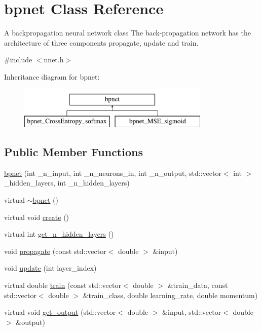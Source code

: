 \hypertarget{classbpnet}{\section{bpnet Class Reference}
\label{classbpnet}
}


A backpropagation neural network class The back-\/propagation network has the architecture of three components propagate, update and train.  




{\ttfamily \#include $<$nnet.\-h$>$}

Inheritance diagram for bpnet\-:\begin{figure}[H]
\begin{center}
\leavevmode
\includegraphics[height=2.000000cm]{classbpnet}
\end{center}
\end{figure}
\subsection*{Public Member Functions}
\begin{DoxyCompactItemize}
\item 
\hyperlink{classbpnet_adfeeece0abde65630da85276488cc0b2}{bpnet} (int \-\_\-n\-\_\-input, int \-\_\-n\-\_\-neurons\-\_\-in, int \-\_\-n\-\_\-output, std\-::vector$<$ int $>$ \-\_\-hidden\-\_\-layers, int \-\_\-n\-\_\-hidden\-\_\-layers)
\item 
virtual \hyperlink{classbpnet_a7189286dfd5cfdd648bcc8c78a177891}{$\sim$bpnet} ()
\item 
virtual void \hyperlink{classbpnet_a3731e200c3191fc77be85f1db2c2d4f9}{create} ()
\item 
virtual int \hyperlink{classbpnet_aa35c06d999256c9aebeed4f38bca9d0f}{get\-\_\-n\-\_\-hidden\-\_\-layers} ()
\item 
void \hyperlink{classbpnet_a77cd3c63e9948e4b6cc9e3a0412e25ea}{propagate} (const std\-::vector$<$ double $>$ \&input)
\item 
void \hyperlink{classbpnet_a87beae9040de4815cbcada7420f0df2a}{update} (int layer\-\_\-index)
\item 
virtual double \hyperlink{classbpnet_a653eae04b7dcfb4271421fd079849f89}{train} (const std\-::vector$<$ double $>$ \&train\-\_\-data, const std\-::vector$<$ double $>$ \&train\-\_\-class, double learning\-\_\-rate, double momentum)
\item 
virtual void \hyperlink{classbpnet_a9da604c278a2d583511071fdc754c9c6}{get\-\_\-output} (std\-::vector$<$ double $>$ \&input, std\-::vector$<$ double $>$ \&output)
\end{DoxyCompactItemize}
